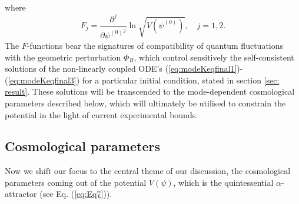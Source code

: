 \documentclass[a4paper,11pt]{article}
\begin{document}
where 
\begin{equation}
    F_j = \frac{\partial^j}{\partial{\psi^{(0)}}^j}\ln{\sqrt{V\left(\psi^{(0)}\right)}},\quad j=1,2.
\end{equation}
The $F$-functions bear the signatures of compatibility of quantum fluctuations with the geometric perturbation $\Phi_B$, which control sensitively the self-consistent solutions of the non-linearly coupled ODE's (\ref{eq:modeKeqfinal1})-(\ref{eq:modeKeqfinal3}) for a particular initial condition, stated in section \ref{sec: result}. These solutions will be transcended to the mode-dependent cosmological parameters described below, which will ultimately be utilised to constrain the potential in the light of current experimental bounds.
\subsection{Cosmological parameters}
\label{sec:cosmoparam}
Now we shift our focus to the central theme of our discussion, the cosmological parameters coming out of the potential $V(\psi)$, which is the quintessential $\alpha$-attractor (see Eq. (\ref{eq:Eq7})).
\end{document}
